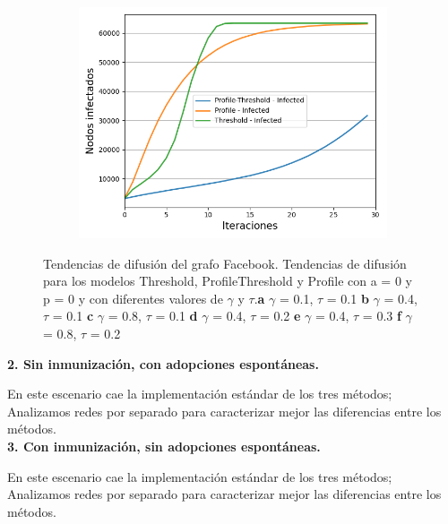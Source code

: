 \documentclass{article}
\begin{document}
\begin{figure}[!tbp]
\begin{subfigure}[b]{0.5\textwidth}
		\caption{}
		\label{fig:f45}
	\end{subfigure}
	\hfill
	\begin{subfigure}[b]{0.5\textwidth}
		\includegraphics[width=\textwidth, height=\textwidth]{../Images/Fig 4 f).png}
		\caption{}
		\label{fig:f46}
	\end{subfigure}
	\caption{Tendencias de difusión del grafo Facebook. Tendencias de difusión para los modelos Threshold, ProfileThreshold y Profile con a = 0 y p = 0 y con diferentes valores de $\gamma$ y $\tau$.\textbf{a} $\gamma$ = 0.1, $\tau$ = 0.1 \textbf{b} $\gamma$ = 0.4, $\tau$ = 0.1 \textbf{c} $\gamma$ = 0.8, $\tau$ = 0.1 \textbf{d} $\gamma$ = 0.4, $\tau$ = 0.2 \textbf{e} $\gamma$ = 0.4, $\tau$ = 0.3 \textbf{f} $\gamma$ = 0.8, $\tau$ = 0.2}
\end{figure}




\textbf{2. Sin inmunización, con adopciones espontáneas.}

En este escenario cae la implementación estándar de los tres métodos; Analizamos redes por separado para caracterizar mejor las diferencias entre los métodos.\\

\textbf{3. Con inmunización, sin adopciones espontáneas.}

En este escenario cae la implementación estándar de los tres métodos; Analizamos redes por separado para caracterizar mejor las diferencias entre los métodos.\\
\end{document}

